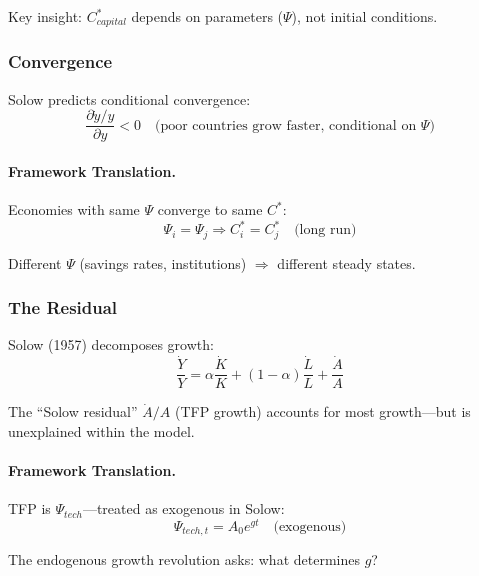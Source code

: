 Key insight: $C^*_{capital}$ depends on parameters ($\Psi$), not initial conditions.

\subsubsection{Convergence}

Solow predicts conditional convergence:
\begin{equation}
\frac{\partial \dot{y}/y}{\partial y} < 0 \quad \text{(poor countries grow faster, conditional on } \Psi\text{)}
\end{equation}

\paragraph{Framework Translation.}
Economies with same $\Psi$ converge to same $C^*$:
\begin{equation}
\Psi_i = \Psi_j \Rightarrow C^*_i = C^*_j \quad \text{(long run)}
\end{equation}

Different $\Psi$ (savings rates, institutions) $\Rightarrow$ different steady states.

\subsubsection{The Residual}

Solow (1957) decomposes growth:
\begin{equation}
\boxed{
\frac{\dot{Y}}{Y} = \alpha \frac{\dot{K}}{K} + (1-\alpha) \frac{\dot{L}}{L} + \frac{\dot{A}}{A}
}
\label{eq:solow-accounting}
\end{equation}

The ``Solow residual'' $\dot{A}/A$ (TFP growth) accounts for most growth---but 
is unexplained within the model.

\paragraph{Framework Translation.}
TFP is $\Psi_{tech}$---treated as exogenous in Solow:
\begin{equation}
\Psi_{tech,t} = A_0 e^{gt} \quad \text{(exogenous)}
\end{equation}

The endogenous growth revolution asks: what determines $g$?

